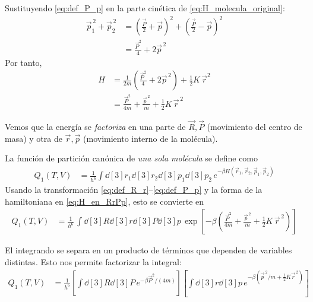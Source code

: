 \documentclass{article}
\begin{document}
Sustituyendo \eqref{eq:def_P_p} en la parte cinética de
\eqref{eq:H_molecula_original}:
\begin{equation}
\begin{split}
\vec p_{1}^{\,2} + \vec p_{2}^{\,2}
&= \left(\frac{\vec P}{2} + \vec p\right)^{2}
 + \left(\frac{\vec P}{2} - \vec p\right)^{2} \\[4pt]
&= \frac{\vec P^{2}}{4} + 2\vec p^{\,2}
\end{split}\label{eq:p1p2_en_Pp}
\end{equation}
Por tanto,
\begin{equation}
\begin{split}
H
&= \frac{1}{2m}\left(\frac{\vec P^{2}}{4} + 2\vec p^{\,2}\right)
   + \frac{1}{2}K\,\vec r^{2} \\[4pt]
&= \frac{\vec P^{2}}{4m} + \frac{\vec p^{\,2}}{m}
   + \frac{1}{2}K\,\vec r^{\,2}
\end{split}\label{eq:H_en_RrPp}
\end{equation}

Vemos que la energía se \emph{factoriza} en una parte de \(\vec R,\vec P\) (movimiento
del centro de masa) y otra de \(\vec r,\vec p\) (movimiento interno de la molécula).


La función de partición canónica de \emph{una sola molécula} se define como
\begin{equation}
\begin{split}
Q_{1}(T,V)
&= \frac{1}{h^{6}}
\int \dd[3]{r_{1}}\dd[3]{r_{2}}\dd[3]{p_{1}}\dd[3]{p_{2}}\,
e^{-\beta H(\vec r_{1},\vec r_{2},\vec p_{1},\vec p_{2})}
\end{split}\label{eq:Q1_def_original}
\end{equation}
Usando la transformación \eqref{eq:def_R_r}–\eqref{eq:def_P_p} y la forma de la
hamiltoniana en \eqref{eq:H_en_RrPp}, esto se convierte en
\begin{equation}
\begin{split}
Q_{1}(T,V)
&= \frac{1}{h^{6}}\,
\int \dd[3]{R}\dd[3]{r}\dd[3]{P}\dd[3]{p}\,
\exp\!\left[-\beta\left(
\frac{\vec P^{2}}{4m} + \frac{\vec p^{\,2}}{m}
+ \frac{1}{2}K\,\vec r^{\,2}
\right)\right]
\end{split}\label{eq:Q1_en_RrPp}
\end{equation}

El integrando se separa en un producto de términos que dependen
de variables distintas. Esto nos permite factorizar la integral:
\begin{equation}
\begin{split}
Q_{1}(T,V)
&= \frac{1}{h^{6}}
\left[\int \dd[3]{R}\dd[3]{P}\,
e^{-\beta \vec P^{2}/(4m)}\right]
\left[\int \dd[3]{r}\dd[3]{p}\,
e^{-\beta\left(\vec p^{\,2}/m + \frac{1}{2}K\vec r^{\,2}\right)}\right]
\end{split}\label{eq:Q1_factorizada}
\end{equation}
\end{document}
